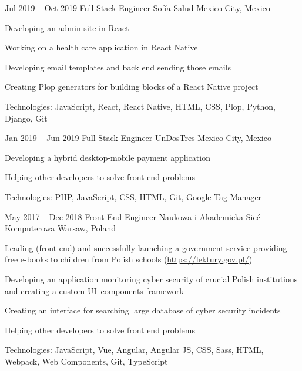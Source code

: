 \begin{sectionlist}
    \sectionlistitemjob
        {Jul 2019 -- Oct 2019}
        {Full Stack Engineer}
        {Sofía Salud}
        {Mexico City, Mexico}
        {
            \begin{joblisting}
                \item Developing an admin site in React
                \item Working on a health care application in React Native
                \item Developing email templates and back end sending those emails
                \item Creating Plop generators for building blocks of a React Native project
                \item Technologies: JavaScript, React, React Native,
                    HTML, CSS, Plop, Python, Django, Git
            \end{joblisting}
        }

    \sectionlistitemjob
        {Jan 2019 -- Jun 2019}
        {Full Stack Engineer}
        {UnDosTres}
        {Mexico City, Mexico}
        {
            \begin{joblisting}
                \item Developing a hybrid desktop-mobile payment application
                \item Helping other developers to solve front end problems
                \item Technologies: PHP, JavaScript, CSS, HTML, Git, Google
                    Tag Manager
            \end{joblisting}
        }

    \sectionlistitemjob
        {May 2017 -- Dec 2018}
        {Front End Engineer}
        {Naukowa i Akademicka Sie\'{c} Kom\-pu\-te\-ro\-wa \hfill \linebreak}
        {Warsaw, Poland}
        {
            \begin{joblisting}
                \item Leading (front end) and successfully launching a government
                    service providing free e-books to children from Polish schools
                    (\url{https://lektury.gov.pl/})
                \item Developing an application monitoring cyber security of crucial
                    Polish institutions and creating a custom UI~components
                    framework
                \item Creating an interface for searching large database of cyber
                    security incidents
                \item Helping other developers to solve front end problems
                \item Technologies: JavaScript, Vue, Angular, Angular JS,
                    CSS, Sass, HTML, Webpack, Web Components, Git,
                    TypeScript
            \end{joblisting}
        }


\end{sectionlist}
